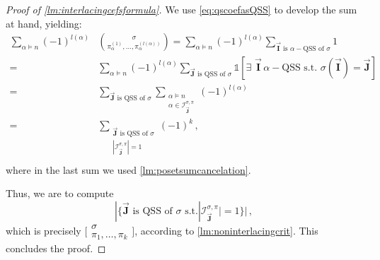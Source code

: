 \documentclass[12pt, reqno]{amsart}
\theoremstyle{definition}
\newcommand{\III}{\vec{\mathbf{I}}}
\newcommand{\JJJ}{\vec{\mathbf{J}}}
\begin{document}
\begin{proof}[Proof of \cref{lm:interlacingcefsformula}]

We use \eqref{eq:qscoefasQSS} to develop the sum at hand, yielding:
\begin{equation}
\begin{split}
\sum_{\alpha\models n} (-1)^{l(\alpha )} &\binom{\sigma }{\pi^{(1)}_{\alpha }, \dots ,\pi^{(l(\alpha ))}_{\alpha }} =  \sum_{\alpha\models n}  (-1)^{l(\alpha )} \sum_{\III \text{ is } \alpha-\text{QSS of $\sigma$}} 1  \\
 =&  \sum_{\alpha\models n} (-1)^{l(\alpha )} \sum_{\JJJ \text{ is QSS of $\sigma$}} \mathbb{1}[\exists \, \, \III \, \alpha-\text{QSS s.t. } \sigma(\III) = \JJJ]   \\
 =& \sum_{\JJJ \text{ is QSS of $\sigma$}} \sum_{\substack{\alpha\models n\\ \alpha \in \mathcal I^{\sigma, \pi}_{\JJJ}}}  (-1)^{l(\alpha )}  \\
  =& \sum_{\substack{\JJJ \text{ is QSS of $\sigma$}\\ |\mathcal I^{\sigma, \pi}_{\JJJ}| = 1}} (-1)^k\, , \\
\end{split}
\end{equation}
where in the last sum we used \cref{lm:posetsumcancelation}.

Thus, we are to compute
$$|\{ \JJJ \text{ is QSS of $\sigma$ s.t.} |\mathcal I^{\sigma, \pi}_{\JJJ}| = 1 \} |\, , $$
which is precisely $ \bigl[\!\begin{smallmatrix} \sigma  \\ \pi_1, \dots ,\pi_k \end{smallmatrix}\!\bigr]$, according to \cref{lm:noninterlacingcrit}.
This concludes the proof.
\end{proof}






\end{document}
